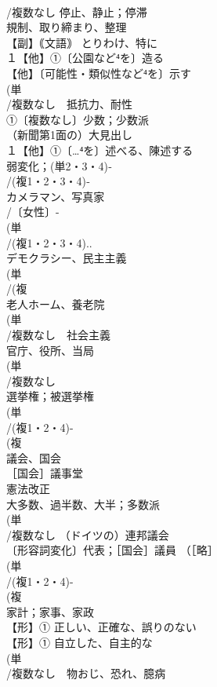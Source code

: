 \documentclass[8pt]{extreport}
\begin{document}
\begin{CJK}{UTF8}{min}
\\	/複数なし 停止、静止；停滞
\\	規制、取り締まり、整理
\\	【副】｟文語｠ とりわけ、特に
\\	１【他】①〔公園など⁴を〕造る
\\	【他】〔可能性・類似性など⁴を〕示す
\\	(単
\\	/複数なし　抵抗力、耐性
\\	①〔複数なし〕少数；少数派 
\\	（新聞第1面の）大見出し
\\	１【他】①〔…⁴を〕述べる、陳述する
\\	弱変化；(単2・3・4)‐
\\	/(複1・2・3・4)‐
\\	カメラマン、写真家 
\\	/〔女性〕-
\\	(単
\\	/(複1・2・3・4)..
\\	デモクラシー、民主主義 
\\	(単
\\	/(複
\\	老人ホーム、養老院
\\	(単
\\	/複数なし　社会主義
\\	官庁、役所、当局 
\\	(単
\\	/複数なし 
\\	選挙権；被選挙権
\\	(単
\\	/(複1・2・4)-
\\	(複
\\	議会、国会 
\\	［国会］議事堂 
\\	憲法改正
\\	大多数、過半数、大半；多数派 
\\	(単
\\	/複数なし （ドイツの）連邦議会 
\\	〔形容詞変化〕代表；［国会］議員 （［略］
\\	(単
\\	/(複1・2・4)-
\\	(複
\\	家計；家事、家政
\\	【形】① 正しい、正確な、誤りのない 
\\	【形】① 自立した、自主的な
\\	(単
\\	/複数なし　物おじ、恐れ、臆病 

\end{CJK}
\end{document}
